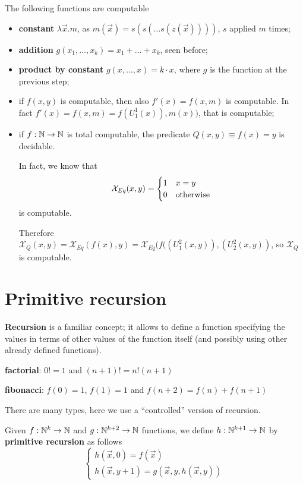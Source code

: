 \begin{example}
  The following functions are computable
\begin{itemize}
\item \textbf{constant} $\lambda \vec{x}.m$, as $m(\vec{x}) = s(s(\dots s(z(\vec{x}))))$, $s$ applied $m$ times;
\item \textbf{addition} $g(x_1,\dots,x_k) = x_1 + \dots + x_k$, seen before;
\item \textbf{product by constant} $g(x,\dots,x) = k \cdot x$, where $g$ is the function at the previous step;
\item if $f(x,y)$ is computable, then also $f'(x) = f(x,m)$ is computable.
  In fact $f'(x) = f(x,m) = f(U_1^1(x)), m(x))$, that is computable;
\item if $f:\mathbb{N}\rightarrow\mathbb{N}$ is total computable, the predicate $Q(x,y)\equiv f(x) = y$ is decidable.

  In fact, we know that \begin{equation*}
    \mathcal{X}_{Eq}(x,y) = \begin{cases}
    1 & x=y         \\
    0 & $otherwise$
  \end{cases}
\end{equation*}
  is computable.

  Therefore $\mathcal{X}_Q(x,y) = \mathcal{X}_{Eq}(f(x),y) = \mathcal{X}_{Eq}(f((U_1^2(x,y)), (U_2^2(x,y))$, so $\mathcal{X}_Q$ is computable.
\end{itemize}
\end{example}


\section {Primitive recursion}

\textbf{Recursion} is a familiar concept; it allows to define a function specifying the values in terms of other values of the function itself (and possibly using other already defined functions).

\textbf{factorial}: $0! = 1$ and $(n+1)! = n!(n+1)$

\textbf{fibonacci}: $f(0) = 1$, $f(1) = 1$ and $f(n+2) = f(n) + f(n+1)$

There are many types, here we use a ``controlled'' version of recursion.

\begin{definition}
  Given $f:\mathbb{N}^k\rightarrow\mathbb{N}$ and $g:\mathbb{N}^{k+2}\rightarrow\mathbb{N}$ functions,
we define $h:\mathbb{N}^{k+1}\rightarrow\mathbb{N}$ by \textbf{primitive recursion} as follows
\begin{equation*}
  \begin{cases}
    h(\vec{x},0) = f(\vec{x})\\
    h(\vec{x}, y+1) = g(\vec{x},y,h(\vec{x},y))
  \end{cases}
\end{equation*}
\end{definition}

